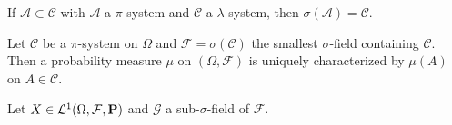 \begin{thm}
	If $\mathcal{A} \subset \mathcal{C}$ with $\mathcal{A}$ a $\pi$-system and $\mathcal{C}$ a $\lambda$-system, then $\sigma(\mathcal{A}) = \mathcal{C}$.
\end{thm}

\begin{thm}
	Let $\mathcal{C}$ be a $\pi$-system on $\Omega$ and $\mathcal{F} = \sigma(\mathcal{C})$ the smallest $\sigma$-field containing $\mathcal{C}$.
	Then a probability measure $\mu$ on $(\Omega, \mathcal{F})$ is uniquely characterized by $\mu(A)$ on $A \in \mathcal{C}$.
\end{thm}

\begin{defn}
	Let $X \in \mathcal{L}^1(\Omega, \mathcal{F}, \mathbf{P})$ and $\mathcal{G}$ a sub-$\sigma$-field of $\mathcal{F}$.
\end{defn}
